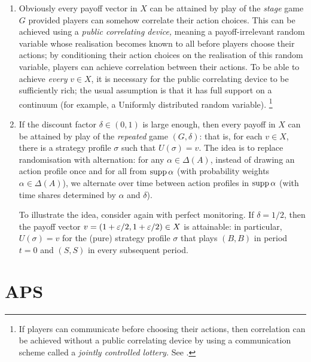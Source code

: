 \begin{remark}
\begin{enumerate}[label=(\alph*),resume]
		\item \label{item:X_converse:stage_pos} Obviously every payoff vector in $X$ can be attained by play of the \emph{stage} game $G$ provided players can somehow correlate their action choices. This can be achieved using a \emph{public correlating device,} meaning a payoff-irrelevant random variable whose realisation becomes known to all before players choose their actions; by conditioning their action choices on the realisation of this random variable, players can achieve correlation between their actions. To be able to achieve \emph{every} $v \in X$, it is necessary for the public correlating device to be sufficiently rich; the usual assumption is that it has full support on a continuum (for example, a Uniformly distributed random variable).%
			\footnote{If players can communicate before choosing their actions, then correlation can be achieved without a public correlating device by using a communication scheme called a \emph{jointly controlled lottery.} See \textcite[][p.~18]{MailathSamuelson2006}.}

		\item \label{item:X_converse:rep_pos} If the discount factor $\delta \in (0,1)$ is large enough, then every payoff in $X$ can be attained by play of the \emph{repeated} game $(G,\delta)$: that is, for each $v \in X$, there is a strategy profile $\sigma$ such that $U(\sigma) = v$. The idea is to replace randomisation with alternation: for any $\alpha \in \Delta(A)$, instead of drawing an action profile once and for all from $\operatorname*{supp} \alpha$ (with probability weights $\alpha \in \Delta(A)$), we alternate over time between action profiles in $\operatorname*{supp} \alpha$ (with time shares determined by $\alpha$ and $\delta$).

		To illustrate the idea, consider again  with perfect monitoring. If $\delta=1/2$, then the payoff vector $v = \left( 1+\eps/2, 1+\eps/2 \right) \in X$ is attainable: in particular, $U(\sigma)=v$ for the (pure) strategy profile $\sigma$ that plays $(B,B)$ in period $t=0$ and $(S,S)$ in every subsequent period.

	\end{enumerate}
\end{remark}



\section{APS}
\label{aps:selfgen}

